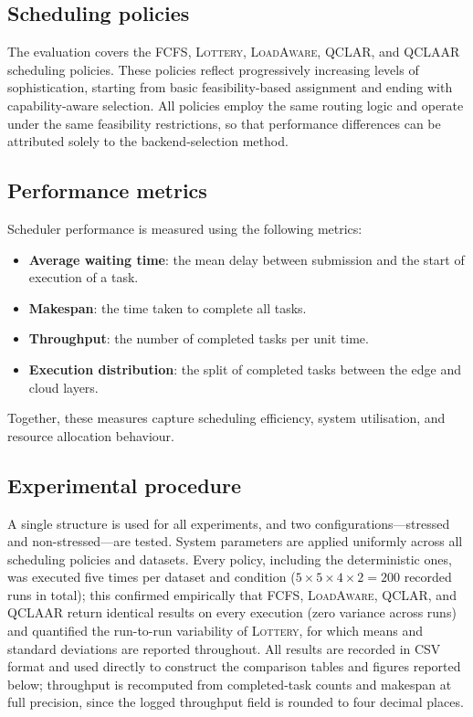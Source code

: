 \documentclass[preprint,12pt]{elsarticle}
\newcommand{\QCLAR}{\textsc{QCLAR}}
\newcommand{\QCLAAR}{\textsc{QCLAAR}}
\newcommand{\LoadAware}{\textsc{LoadAware}}
\newcommand{\FCFS}{\textsc{FCFS}}
\newcommand{\Lottery}{\textsc{Lottery}}
\begin{document}
\subsection{Scheduling policies}
The evaluation covers the \FCFS{}, \Lottery{}, \LoadAware{}, \QCLAR{}, and
\QCLAAR{} scheduling policies. These policies reflect progressively increasing
levels of sophistication, starting from basic feasibility-based assignment and
ending with capability-aware selection. All policies employ the same routing
logic and operate under the same feasibility restrictions, so that performance
differences can be attributed solely to the backend-selection method.

\subsection{Performance metrics}
Scheduler performance is measured using the following metrics:
\begin{itemize}
  \item \textbf{Average waiting time}: the mean delay between submission and the
        start of execution of a task.
  \item \textbf{Makespan}: the time taken to complete all tasks.
  \item \textbf{Throughput}: the number of completed tasks per unit time.
  \item \textbf{Execution distribution}: the split of completed tasks between the
        edge and cloud layers.
\end{itemize}
Together, these measures capture scheduling efficiency, system utilisation, and
resource allocation behaviour.

\subsection{Experimental procedure}
A single structure is used for all experiments, and two configurations---stressed
and non-stressed---are tested. System parameters are applied uniformly across all
scheduling policies and datasets. Every policy, including the deterministic
ones, was executed five times per dataset and condition ($5 \times 5 \times 4
\times 2 = 200$ recorded runs in total); this confirmed empirically that
\FCFS{}, \LoadAware{}, \QCLAR{}, and \QCLAAR{} return identical results on
every execution (zero variance across runs) and quantified the run-to-run
variability of \Lottery{}, for which means and standard deviations are reported
throughout. All results are recorded in CSV format and used directly to
construct the comparison tables and figures reported below; throughput is
recomputed from completed-task counts and makespan at full precision, since the
logged throughput field is rounded to four decimal places.
\end{document}
